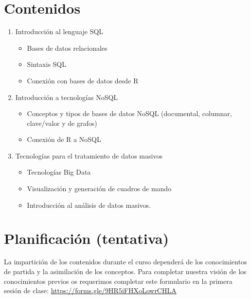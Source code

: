 \documentclass[]{book}
\providecommand{\tightlist}{%
  \setlength{\itemsep}{0pt}\setlength{\parskip}{0pt}}
\begin{document}
\section{Contenidos}\label{contenidos}

\begin{enumerate}
\def\labelenumi{\arabic{enumi}.}
\tightlist
\item
  Introducción al lenguaje SQL

  \begin{itemize}
  \tightlist
  \item
    Bases de datos relacionales
  \item
    Sintaxis SQL
  \item
    Conexión con bases de datos desde R
  \end{itemize}
\item
  Introducción a tecnologías NoSQL

  \begin{itemize}
  \tightlist
  \item
    Conceptos y tipos de bases de datos NoSQL (documental, columnar,
    clave/valor y de grafos)
  \item
    Conexión de R a NoSQL
  \end{itemize}
\item
  Tecnologías para el tratamiento de datos masivos

  \begin{itemize}
  \tightlist
  \item
    Tecnologías Big Data
  \item
    Visualización y generación de cuadros de mando
  \item
    Introducción al análisis de datos masivos.
  \end{itemize}
\end{enumerate}

\section{Planificación (tentativa)}\label{planificaciuxf3n-tentativa}

La impartición de los contenidos durante el curso dependerá de los
conocimientos de partida y la asimilación de los conceptos. Para
completar nuestra visión de los conocimientos previos os requerimos
completar este formulario en la primera sesión de clase:
\url{https://forms.gle/9HR5iFHXoLowrCHLA}
\end{document}
